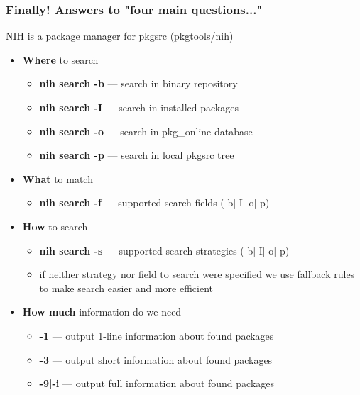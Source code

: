 \documentclass[hyperref=unicode,ascii,xcolor=dvipsnames]{beamer}
\begin{document}

\begin{frame}[fragile]
  \frametitle{Finally! Answers to "four main questions..."}
NIH is a package manager for pkgsrc (pkgtools/nih)
\begin{itemize}
\item {\bf Where} to search
  \begin{itemize}
  \item {\bf nih search -b} --- search in binary repository
  \item {\bf nih search -I} --- search in installed packages
  \item {\bf nih search -o} --- search in pkg\_online database
  \item {\bf nih search -p} --- search in local pkgsrc tree
  \end{itemize}
\item {\bf What} to match
  \begin{itemize}
  \item {\bf nih search -f} --- supported search fields (-b|-I|-o|-p)
  \end{itemize}
\item {\bf How} to search
  \begin{itemize}
  \item {\bf nih search -s} --- supported search strategies (-b|-I|-o|-p)
  \item if neither strategy nor field to search were specified we use
    fallback rules to make search easier and more efficient
  \end{itemize}
\item {\bf How much} information do we need
  \begin{itemize}
  \item {\bf -1} --- output 1-line information about found packages
  \item {\bf -3} --- output short information about found packages
  \item {\bf -9|-i} --- output full information about found packages
  \end{itemize}
\end{itemize}
\end{frame}

\end{document}
